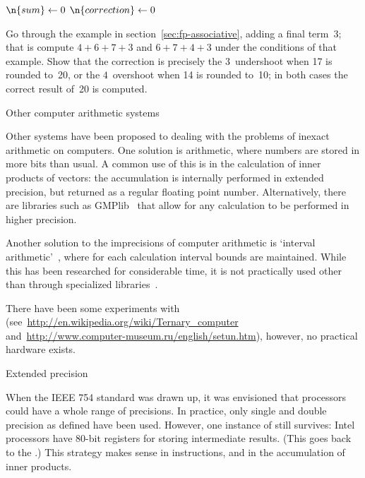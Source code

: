 \begin{displayalgorithm}
  $\n{sum}\leftarrow0$\;
  $\n{correction}\leftarrow0$\;
\end{displayalgorithm}

\begin{exercise}
  \label{ex:kahan-sum}
  Go through the example in section~\ref{sec:fp-associative}, adding a
  final term~3; that is compute $4+6+7+3$ and $6+7+4+3$ under the
  conditions of that example.
  Show that the correction is precisely the $3$~undershoot when 17 is rounded
  to~20, or the $4$~overshoot when 14 is rounded to~10; in both cases
  the correct result of~20 is computed.
\end{exercise}

 {Other computer arithmetic systems}

Other systems have been proposed to dealing with the problems of
inexact arithmetic on computers. One solution is 
arithmetic, where numbers are stored in more bits than usual. A common
use of this is in the calculation of inner products of vectors: the
accumulation is internally performed in extended precision, but
returned as a regular floating point number. Alternatively, there are
libraries such as GMPlib~\cite{gmplib} that allow for any calculation
to be performed in higher precision.

Another solution to the imprecisions of computer arithmetic is
`interval arithmetic'~\cite{wikipedia:interval-arithmetic}, where for each
calculation interval bounds are maintained. While this has been
researched for considerable time, it is not practically used other
than through specialized libraries~\cite{boost:interval-arithmetic}.

There have been some experiments with 
(see~\url{http://en.wikipedia.org/wiki/Ternary_computer}
and~\url{http://www.computer-museum.ru/english/setun.htm}), however,
no practical hardware exists.

 {Extended precision}
\label{sec:ext-prec}

When the IEEE 754 standard was drawn up, it was envisioned that 
processors could have a whole range of precisions. In practice,
only single and double precision as defined have been used.
However, one instance of  still survives:
Intel processors have 80-bit registers for storing intermediate results.
(This goes back to the .)
This strategy makes sense in  instructions, 
and in the accumulation of inner products.

